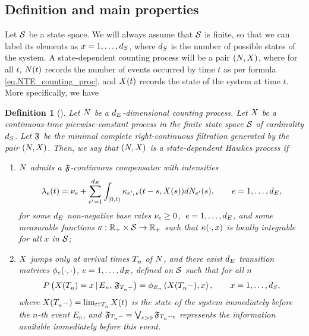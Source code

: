 \documentclass[10pt]{article}
\newtheorem{defi}[thm]{Definition}
\begin{document}
\subsection{Definition and main properties}\label{sec.sdHawkes_def_and_props}
Let $\stateSpace$ be a state space. We will always assume that $\stateSpace$ is finite, so that we can label its elements as $x=1, \dots, \numStates$, where $\numStates$ is the number of possible states of the system. A state-dependent counting process will be a pair $(\multiCountingProc, \stateVariable)$, where for all $t$, $\multiCountingProc(t)$ records the number of events occurred by time $t$ as per formula \eqref{eq.NTE_counting_proc}, and $\stateVariable(t)$ records the state of the system at time $t$. More specifically, we have
\begin{defi}[{\citealp[Definition 2.1]{MP18sta}}]\label{def.sdHawkes}
 Let $\multiCountingProc$ be a $\numEventTypes$-dimensional counting process. Let $\stateVariable$ be a continuous-time picewise-constant process in the finite state space $\stateSpace$ of cardinality $\numStates$. Let $\filtrationF$ be the minimal complete right-continuous filtration generated by the pair $(\multiCountingProc, \stateVariable)$. Then, we say that $(\multiCountingProc, \stateVariable)$ is a state-dependent Hawkes process if 
 \begin{enumerate}
  \item $\multiCountingProc$ admits a $\filtrationF$-continuous compensator with intensities
  \begin{equation}\label{eq.intensity_of_sdHawkes}
   \intensity(t) = \baseRate_e + \sum_{\eone=1}^{\numEventTypes}\int_{[0,t)} \hawkesKernel\subscriptee(t-s, \stateVariable(s))d\countingProc[\eone](s), \qquad e=1,\dots,\numEventTypes,
  \end{equation}
  for some $\numEventTypes$ non-negative base rates $\baseRate_e\geq 0$, $\, e=1, \dots, \numEventTypes$, and some measurable functions $\hawkesKernel: \R_+ \times \stateSpace \rightarrow \R_+$ such that $\hawkesKernel(\cdot, x)$ is locally integrable for all $x$ in $\stateSpace$;
  \item $\stateVariable$ jumps only at arrival times $\arrivalTimes[ ]_{n}$ of $\multiCountingProc$, and there exist $\numEventTypes$ transition matrices $\transProb_e(\cdot,\cdot)$, $e=1,\dots, \numEventTypes$, defined on $\stateSpace$ such that for all $n$
  \begin{equation}\label{eq.markov_update_stateVariable}
   \Prob\left( \stateVariable(\arrivalTimes[ ]_{n})=x \,  \vert \,  E_n, \, \filtrationF_{\arrivalTimes[ ]_{n}-} \right)
   =
   \transProb_{E_n}\left(\stateVariable(\arrivalTimes[ ]_{n}-),x\right),
   \qquad
   x=1, \dots, \numStates,
  \end{equation}
  where $\stateVariable(\arrivalTimes[ ]_{n}- ) = \lim_{t\uparrow \arrivalTimes[ ]_{n}} \stateVariable(t)$ is the state of the system immediately before the $n$-th event $E_n$, and $\filtrationF_{\arrivalTimes[ ]_{n}-} = \bigvee_{\epsilon>0} \filtrationF_{\arrivalTimes[ ]_{n} - \epsilon}$ represents the information available immediately before this event.
 \end{enumerate}
\end{defi}
\end{document}
